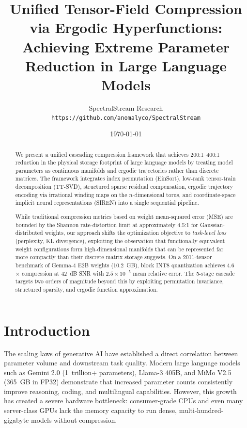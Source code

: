 \documentclass[11pt,a4paper]{article}
\title{Unified Tensor-Field Compression via Ergodic Hyperfunctions:\\ 
       Achieving Extreme Parameter Reduction in Large Language Models}
\author{SpectralStream Research \\
        \texttt{https://github.com/anomalyco/SpectralStream}}
\date{\today}
\begin{document}
\maketitle

\begin{abstract}
	We present a unified cascading compression framework that achieves 200:1--400:1 reduction
	in the physical storage footprint of large language models by treating model parameters as
	continuous manifolds and ergodic trajectories rather than discrete matrices. The framework
	integrates index permutation (EinSort), low-rank tensor-train decomposition (TT-SVD),
	structured sparse residual compensation, ergodic trajectory encoding via irrational winding
	maps on the $n$-dimensional torus, and coordinate-space implicit neural representations
	(SIREN) into a single sequential pipeline.

	While traditional compression metrics based on weight mean-squared error (MSE) are bounded
	by the Shannon rate-distortion limit at approximately 4.5:1 for Gaussian-distributed weights,
	our approach shifts the optimization objective to \emph{task-level loss} (perplexity,
	KL divergence), exploiting the observation that functionally equivalent weight configurations
	form high-dimensional manifolds that can be represented far more compactly than their
	discrete matrix storage suggests. On a 2011-tensor benchmark of Gemma-4 E2B weights
	(10.2~GB), block INT8 quantization achieves 4.6$\times$ compression at 42~dB SNR with
	$2.5 \times 10^{-5}$ mean relative error. The 5-stage cascade targets two orders of
	magnitude beyond this by exploiting permutation invariance, structured sparsity, and
	ergodic function approximation.
\end{abstract}

\section{Introduction}

The scaling laws of generative AI have established a direct correlation between parameter
volume and downstream task quality. Modern large language models such as Gemini 2.0
(1~trillion+ parameters), Llama-3 405B, and MiMo V2.5 (365~GB in FP32) demonstrate that
increased parameter counts consistently improve reasoning, coding, and multilingual
capabilities. However, this growth has created a severe hardware bottleneck: consumer-grade
CPUs and even many server-class GPUs lack the memory capacity to run dense,
multi-hundred-gigabyte models without compression.
\end{document}
